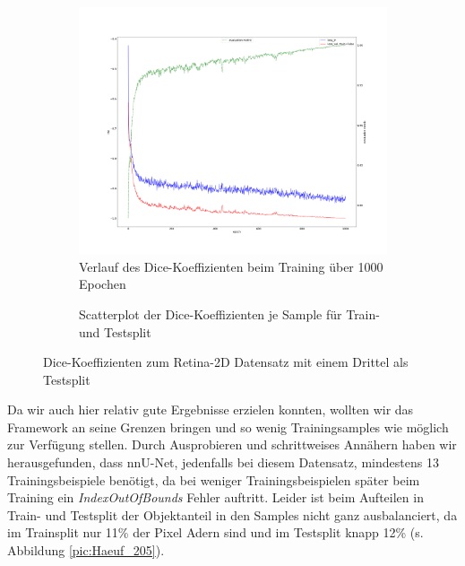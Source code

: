 \begin{figure}[H]
\centering
\begin{minipage}{.6\textwidth}
\begin{subfigure}{\textwidth}
\centering
\includegraphics[width=\textwidth]{Pictures/nnUnet/Praxis/Task203-Augen-drittel-testsplit/progress_203-Augen-drittel-split.png}
\caption{Verlauf des Dice-Koeffizienten beim Training über 1000 Epochen}
\label{pic:Prog_203}
\end{subfigure}
\end{minipage}%
\begin{minipage}{.4\textwidth}
\begin{subfigure}{\textwidth}

\caption{Scatterplot der Dice-Koeffizienten je Sample für Train- und Testsplit}
\label{pic:Dice_203}
\end{subfigure}
\end{minipage}

\caption{Dice-Koeffizienten zum Retina-2D Datensatz \cite{retina2d} mit einem Drittel als Testsplit}
\end{figure}

Da wir auch hier relativ gute Ergebnisse erzielen konnten, wollten wir das Framework an seine Grenzen bringen und so wenig Trainingsamples wie möglich zur Verfügung stellen. Durch Ausprobieren und schrittweises Annähern haben wir herausgefunden, dass nnU-Net, jedenfalls bei diesem Datensatz, mindestens 13 Trainingsbeispiele benötigt, da bei weniger Trainingsbeispielen später beim Training ein \textit{IndexOutOfBounds} Fehler auftritt. Leider ist beim Aufteilen in Train- und Testsplit der Objektanteil in den Samples nicht ganz ausbalanciert, da im Trainsplit nur 11\% der Pixel Adern sind und im Testsplit knapp 12\% (s. Abbildung \ref{pic:Haeuf_205}).


